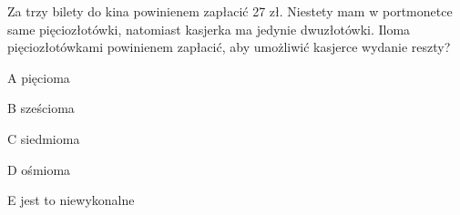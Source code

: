 \begin{tresc}
Za trzy bilety do kina powinienem zapłacić 27 zł. Niestety mam w portmonetce same pięciozłotówki, natomiast kasjerka ma jedynie dwuzłotówki. Iloma pięciozłotówkami powinienem zapłacić, aby umożliwić kasjerce wydanie reszty?
\end{tresc}
\begin{wariant}{A} pięcioma \end{wariant}
\begin{wariant}{B} sześcioma \end{wariant}
\begin{wariant}{C} siedmioma \end{wariant}
\begin{wariant}{D} ośmioma \end{wariant}
\begin{wariant}{E} jest to niewykonalne \end{wariant}
